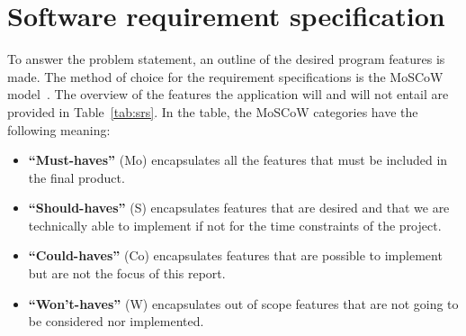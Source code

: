 \section{Software requirement specification}\label{sec:software-requirement-specification}

To answer the problem statement, an outline of the desired program features is made.
The method of choice for the requirement specifications is the MoSCoW model~\cite{hudaib2018}.
The overview of the features the application will and will not entail are provided in Table~\ref{tab:srs}.
In the table, the MoSCoW categories have the following meaning:

\begin{itemize}
    \item \textbf{``Must-haves''} (Mo) encapsulates all the features that must be
    included in the final product.
    \item \textbf{``Should-haves''} (S) encapsulates features that are desired and that we are technically able to
    implement if not for the time constraints of the project.
    \item \textbf{``Could-haves''} (Co) encapsulates features that are possible
    to implement but are not the focus of this report.
    \item \textbf{``Won't-haves''} (W) encapsulates out of scope features that are not going to be considered nor
    implemented.
\end{itemize}

